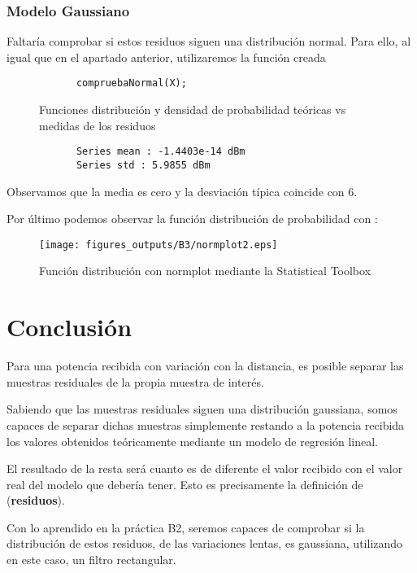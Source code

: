 \documentclass{article}
\begin{document}
    \subsubsection{Modelo Gaussiano}
        \par Faltaría comprobar si estos residuos siguen una distribución normal. Para ello, al igual que en el apartado anterior, utilizaremos la función creada 
        \begin{lstlisting}
            compruebaNormal(X);
        \end{lstlisting}
        \begin{figure}[h]
            \centering
            \begin{subfigure}
                  \texttt{[image: figures\_outputs/B3/pdf2.eps]} 
            \end{subfigure}
            \begin{subfigure}
                   \texttt{[image: figures\_outputs/B3/FD2.eps]}
            \end{subfigure}
            \caption{Funciones distribución y densidad de probabilidad teóricas vs medidas de los residuos}
            \label{fig:my_label}
        \end{figure}
        \begin{verbatim}
            Series mean : -1.4403e-14 dBm
            Series std : 5.9855 dBm
        \end{verbatim}    
        \par Observamos que la media es cero y la desviación típica coincide con 6.
        \par Por último podemos observar la función distribución de probabilidad con :
    \begin{figure}[h]
        \centering
        \texttt{[image: figures\_outputs/B3/normplot2.eps]}
        \caption{Función distribución con normplot mediante la Statistical Toolbox}
        \label{fig:my_label}
    \end{figure}
\section{Conclusión}
    \par Para una potencia recibida con variación con la distancia, es posible separar las muestras residuales de la propia muestra de interés.
    \par Sabiendo que las muestras residuales siguen una distribución gaussiana, somos capaces de separar dichas muestras simplemente restando a la potencia recibida los valores obtenidos teóricamente mediante un modelo de regresión lineal. 
    \par El resultado de la resta será cuanto es de diferente el valor recibido con el valor real del modelo que debería tener. Esto es precisamente la definición de (\textbf{residuos}).
    \par Con lo aprendido en la práctica B2, seremos capaces de comprobar si la distribución de estos residuos, de las variaciones lentas, es gaussiana, utilizando en este caso, un filtro rectangular.
    
    
    
    
    
    
\end{document}
